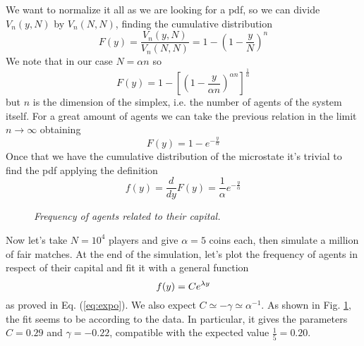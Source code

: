 We want to normalize it all as we are looking for a pdf, so we can divide $V_n\left(y, N\right)$ by $V_n\left(N, N\right)$, finding the cumulative distribution
\begin{equation*}
    F(y) = \frac{V_n\left(y, N\right)}{V_n\left(N, N\right)} = 1 - \left(1 - \frac{y}{N}\right)^n
\end{equation*}
We note that in our case $N=\alpha n$ so
\begin{equation*}
    F(y) =  1 - \left[\left(1 - \frac{y}{\alpha n}\right)^{\alpha n}\right]^\frac{1}{\alpha}
\end{equation*}
but $n$ is the dimension of the simplex, i.e. the number of agents of the system itself.
For a great amount of agents we can take the previous relation in the limit $n\to\infty$ obtaining
\begin{equation*}
    F(y) = 1 - e^{-\frac{y}{\alpha}}
\end{equation*}
Once that we have the cumulative distribution of the microstate it's trivial to find the pdf applying the definition
\begin{equation}
    f(y) = \frac{d}{dy}F(y) = \frac{1}{\alpha} e^{-\frac{y}{\alpha}}
    \label{eq:expo}
\end{equation}

\begin{figure}[ht!]
    \centering
    \scalebox{.7}{}
    \caption{\emph{Frequency of agents related to their capital.}}
    \label{fig:expo}
\end{figure}
Now let's take $N = 10^4$ players and give $\alpha = 5$ coins each, then simulate a million of fair matches.
At the end of the simulation, let's plot the frequency of agents in respect of their capital and fit \cite{root} it with a general function 
\begin{equation}
    f(y) = Ce^{\lambda y}
    \label{eq:generalExpo}
\end{equation}
as proved in Eq. (\ref{eq:expo}).
We  also expect $C \simeq -\gamma \simeq \alpha^{-1}$.
As shown in Fig. \ref{fig:expo}, the fit seems to be according to the data.
In particular, it gives the parameters $C = 0.29$ and $\gamma = -0.22$, compatible with the expected value $\frac{1}{5} = 0.20$.
